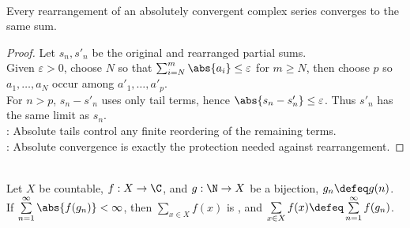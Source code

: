 \begin{theorem} \label{thm:absolute-convergence-rearrangements} \\
Every rearrangement of an absolutely convergent complex series converges to the same sum.
\begin{proof}
Let $s_n,s'_n$ be the original and rearranged partial sums.\\
Given $\varepsilon>0$, choose $N$ so that $\sum_{i=N}^{m}\abs{a_i}\leq\varepsilon$ for $m\geq N$, then choose $p$ so $a_1,\ldots,a_N$ occur among $a'_1,\ldots,a'_p$.\\
For $n>p$, $s_n-s'_n$ uses only tail terms, hence $\abs{s_n-s'_n}\leq\varepsilon$. Thus $s'_n$ has the same limit as $s_n$.\\
: Absolute tails control any finite reordering of the remaining terms.\\
: Absolute convergence is exactly the protection needed against rearrangement.
\end{proof}
\end{theorem}

\begin{definition} \label{def:absolute-summation-over-countable-set} \\
Let $X$ be countable, $f:X\to\C$, and $g:\N\to X$ be a bijection, $g_n\defeq g(n)$.\\
If $\sum\limits_{n=1}^{\infty}\abs{f(g_n)}<\infty$, then $\sum\limits_{x\in X}f(x)$ is , and $\sum\limits_{x\in X}f(x)\defeq\sum\limits_{n=1}^{\infty}f(g_n)$.
\end{definition}


